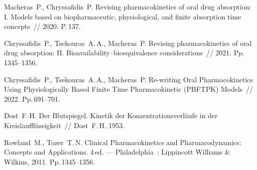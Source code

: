 \begin{vkrthesis}
	
	\begin{vkrreferences}
		\item
		Macheras~P., Chryssafidis~P. Revising pharmacokinetics of oral drug absorption: I. Models based on biopharmaceutic, physiological, and finite absorption time concepts~// 2020. P.\,137.
		
		\item
		Chryssafidis~P., Tsekouras~A.\,A., Macheras~P. Revising pharmacokinetics of oral drug absorption: II. Bioavailability--bioequivalence considerations~// 2021. Pp.\,1345--1356.
		
		\item
		Chryssafidis~P., Tsekouras~A.\,A., Macheras~P. Re-writing Oral Pharmacokinetics Using Physiologically Based Finite Time Pharmacokinetic (PBFTPK) Models~// 2022. Pp.\,691--701.
		
		\item
		Dost~F.\,H. Der Blutspiegel. Kinetik der Konzentrationsverläufe in der Kreislaufflüssigkeit~// Dost~F.\,H. 1953.
		
		\item
		Rowland~M., Tozer~T.\,N. Clinical Pharmacokinetics and Pharmacodynamics: Concepts and Applications. 4\,ed. --- Philadelphia~: Lippincott Williams \& Wilkins, 2011. Pp.\,1345--1356.
	\end{vkrreferences}
	
\end{vkrthesis}
